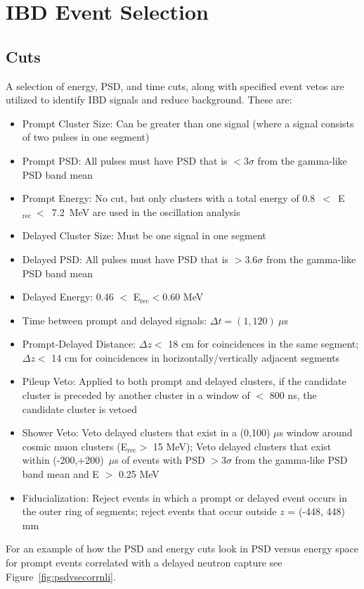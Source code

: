 \section{IBD Event Selection}

\subsection{Cuts}

A selection of energy, PSD, and time cuts, along with specified event vetos are utilized to identify IBD signals and reduce background.
These are:
\begin{itemize}
	\item Prompt Cluster Size: Can be greater than one signal (where a signal consists of two pulses in one segment)
	\item Prompt PSD: All pulses must have PSD that is $<3\sigma$ from the gamma-like PSD band mean
	\item Prompt Energy: No cut, but only clusters with a total energy of 0.8~$<$~E$_{\textrm{rec}}~<$~7.2~MeV are used in the oscillation analysis
	\item Delayed Cluster Size: Must be one signal in one segment
	\item Delayed PSD: All pulses must have PSD that is $>3.6\sigma$ from the gamma-like PSD band mean
	\item Delayed Energy: 0.46 $<$ E$_{\textrm{rec}} < $0.60 MeV
	\item Time between prompt and delayed signals: $\Delta t = (1,120)~\mu$s
	\item Prompt-Delayed Distance: $\Delta z <$ 18 cm for coincidences in the same segment; $\Delta z <$ 14 cm for coincidences in horizontally/vertically adjacent segments
	\item Pileup Veto: Applied to both prompt and delayed clusters, if the candidate cluster is preceded by another cluster in a window of $<$ 800 ns, the candidate cluster is vetoed
	\item Shower Veto: Veto delayed clusters that exist in a (0,100) $\mu$s window around cosmic muon clusters (E$_{\textrm{rec}} >$ 15 MeV); Veto delayed clusters that exist within (-200,+200)~$\mu$s of events with PSD $> 3\sigma$ from the gamma-like PSD band mean and E $>$ 0.25 MeV
	\item Fiducialization: Reject events in which a prompt or delayed event occurs in the outer ring of segments; reject events that occur outside $z$ = (-448, 448) mm 
\end{itemize}
For an example of how the PSD and energy cuts look in PSD versus energy space for prompt events correlated with a delayed neutron capture see Figure~\ref{fig:psdvsecorrnli}.

